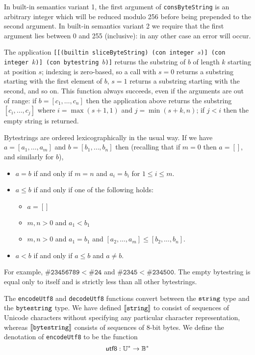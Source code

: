 \label{note:consbytestring}
In built-in semantics variant 1, the first argument of \texttt{consByteString}
is an arbitrary integer which will be reduced modulo 256 before being prepended
to the second argument.  In built-in semantics variant 2 we require that the first
argument lies between 0 and 255 (inclusive): in any other case an error will
occur.

\label{note:slicebytestring}
The application \texttt{[[(builtin sliceByteString) (con integer $s$)] (con
    integer $k$)] (con bytestring $b$)]} returns the substring of $b$ of length
$k$ starting at position $s$; indexing is zero-based, so a call with $s=0$
returns a substring starting with the first element of $b$, $s=1$ returns a
substring starting with the second, and so on.  This function always succeeds,
even if the arguments are out of range: if $b=[c_1, \ldots, c_n]$ then the
  application above returns the substring $[c_i, \ldots, c_j]$ where
  $i=\max(s+1,1)$ and $j=\min(s+k, n)$; if $j<i$ then the empty string is returned.

\label{note:bytestring-comparison}
Bytestrings are ordered lexicographically in the usual way. If we have $a =
  [a_1, \ldots, a_m]$ and $b = [b_1, \ldots, b_n]$ then (recalling that if $m=0$
  then $a=[]$, and similarly for $b$),
\begin{itemize}
\item $a = b$ if and only if $m=n$ and $a_i = b_i$ for $1 \leq i \leq m$.

\item $a \leq b$ if and only if one of the following holds:
\begin{itemize}
  \item $a = []$
  \item $m,n > 0$ and $a_1 < b_1$
  \item $m,n > 0$ and $a_1 = b_1$ and $[a_2,\ldots,a_m] \leq [b_2,\ldots,b_n]$.
\end{itemize}
\item $a < b$ if and only if $a \leq b$ and $a \neq b$.
\end{itemize}
\noindent For example, $\mathtt{\#23456789} < \mathtt{\#24}$ and
$\mathtt{\#2345} < \mathtt{\#234500}$.  The empty bytestring is equal only to
itself and is strictly less than all other bytestrings.

\label{note:bytestring-encoding}
The \texttt{encodeUtf8} and \texttt{decodeUtf8} functions convert between the
$\mathtt{string}$ type and the $\mathtt{bytestring}$ type.  We have defined
$\llbracket\mathit{\mathtt{string}}\rrbracket$ to consist of sequences of Unicode characters without
specifying any particular character representation, whereas
$\llbracket\mathit{\mathtt{bytestring}}\rrbracket$ consists of sequences of 8-bit bytes.  We define the
denotation of \texttt{encodeUtf8} to be the function
$$
\mathsf{utf8}: \mathbb{U}^* \rightarrow \mathbb{B}^*
$$

